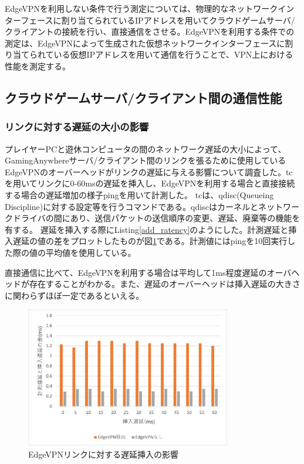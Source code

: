 EdgeVPNを利用しない条件で行う測定については、物理的なネットワークインターフェースに割り当てられているIPアドレスを用いてクラウドゲームサーバ/クライアントの接続を行い、直接通信をさせる。EdgeVPNを利用する条件での測定は、EdgeVPNによって生成された仮想ネットワークインターフェースに割り当てられている仮想IPアドレスを用いて通信を行うことで、VPN上における性能を測定する。

\subsection{クラウドゲームサーバ/クライアント間の通信性能}

\subsubsection{リンクに対する遅延の大小の影響}
プレイヤーPCと遊休コンピュータの間のネットワーク遅延の大小によって、GamingAnywhereサーバ/クライアント間のリンクを張るために使用しているEdgeVPNのオーバーヘッドがリンクの遅延に与える影響について調査した。tc\cite{iproute2}を用いてリンクに0-60msの遅延を挿入し、EdgeVPNを利用する場合と直接接続する場合の遅延増加の様子ping\cite{ping}を用いて計測した。
tcは、qdisc(Queueing Discipline)に対する設定等を行うコマンドである。qdiscはカーネルとネットワークドライバの間にあり、送信パケットの送信順序の変更、遅延、廃棄等の機能を有する。
遅延を挿入する際にListing\ref{add_ratency}のようにした。計測遅延と挿入遅延の値の差をプロットしたものが図\ref{fig:ratency}である。計測値にはpingを10回実行した際の値の平均値を使用している。

直接通信に比べて、EdgeVPNを利用する場合は平均して1ms程度遅延のオーバヘッドが存在することがわかる。また、遅延のオーバーヘッドは挿入遅延の大きさに関わらずほぼ一定であるといえる。

\begin{figure}[h!]
    \centering
    \includegraphics[width=0.8\textwidth,keepaspectratio,clip]{img/graph_ratency.pdf}
    \caption{EdgeVPNリンクに対する遅延挿入の影響}
    \label{fig:ratency}
\end{figure}

